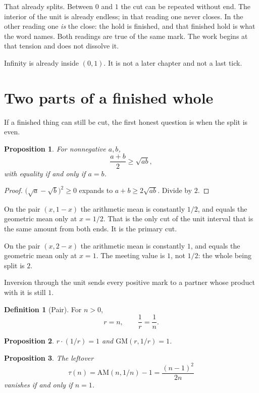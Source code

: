 \documentclass[10pt,a4paper]{article}
\theoremstyle{plain}
\newtheorem{proposition}{Proposition}
\theoremstyle{definition}
\newtheorem{definition}{Definition}
\theoremstyle{remark}
\begin{document}
That already splits.
Between \(0\) and \(1\) the cut can be repeated without end.
The interior of the unit is already endless; in that reading one never closes.
In the other reading one \emph{is} the close: the hold is finished, and that finished hold is what the word names.
Both readings are true of the same mark.
The work begins at that tension and does not dissolve it.

Infinity is already inside \((0,1)\).
It is not a later chapter and not a last tick.

\section{Two parts of a finished whole}

If a finished thing can still be cut, the first honest question is when the split is even.

\begin{proposition}
\label{prop:amgm}
For nonnegative \(a,b\),
\[
\frac{a+b}{2}\ge\sqrt{ab},
\]
with equality if and only if \(a=b\).
\end{proposition}

\begin{proof}
\(\bigl(\sqrt{a}-\sqrt{b}\bigr)^{2}\ge 0\) expands to \(a+b\ge 2\sqrt{ab}\).
Divide by \(2\).
\end{proof}

On the pair \((x,1-x)\) the arithmetic mean is constantly \(1/2\), and equals the geometric mean only at \(x=1/2\).
That is the only cut of the unit interval that is the same amount from both ends.
It is the primary cut.

On the pair \((x,2-x)\) the arithmetic mean is constantly \(1\), and equals the geometric mean only at \(x=1\).
The meeting value is \(1\), not \(1/2\): the whole being split is \(2\).

Inversion through the unit sends every positive mark to a partner whose product with it is still \(1\).

\begin{definition}[Pair]
For \(n>0\),
\[
r=n,\qquad \frac1r=\frac1n.
\]
\end{definition}

\begin{proposition}
\label{prop:pair}
\(r\cdot(1/r)=1\) and \(\mathrm{GM}(r,1/r)=1\).
\end{proposition}

\begin{proposition}
\label{prop:tau}
The leftover
\[
\tau(n)=\mathrm{AM}(n,1/n)-1=\frac{(n-1)^2}{2n}
\]
vanishes if and only if \(n=1\).
\end{proposition}
\end{document}
